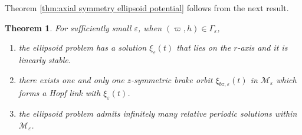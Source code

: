 \documentclass[11pt]{amsart}
\newcommand{\M}{\mathcal M}
\newcommand{\ep}{\varepsilon}
\newcommand{\om}{\varpi}
\newtheorem{thm}{Theorem}[section]
\begin{document}
Theorem \ref{thm:axial symmetry ellipsoid potential} follows from the next result. 
\begin{thm}
	For sufficiently small $\ep$, when $(\om,h) \in \Gamma_\ep$, 
	\begin{enumerate}
		\item[(a)] the ellipsoid problem has a solution $\xi_{\ep}(t)$ that lies on the $r$-axis and it is linearly stable. 
		\item[(b)] there exists one and only one $z$-symmetric brake orbit $\xi_{bz,\ep}(t)$ in $\M_\ep$ which forms a Hopf link with $\xi_{\ep}(t)$.
		\item[(c)] the ellipsoid problem admits infinitely many relative periodic solutions within $\M_\ep$.
	\end{enumerate}
\end{thm}
 
\end{document}
